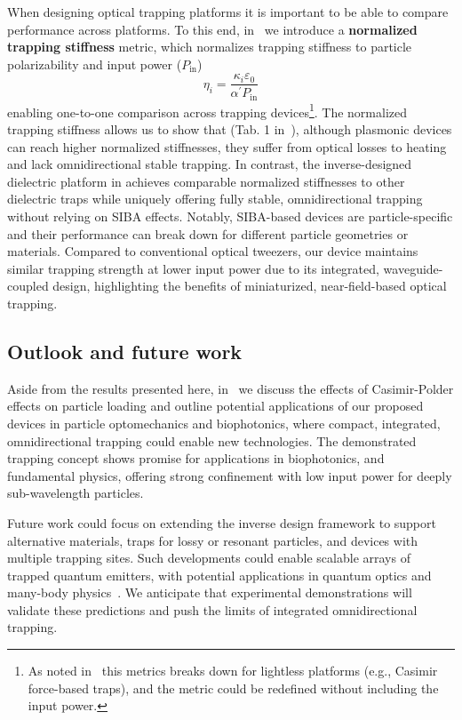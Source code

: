 When designing optical trapping platforms it is important to be able to compare performance across platforms. To this end, in~\cite{ownpub3} we introduce a \textbf{normalized
trapping stiffness} metric, which normalizes trapping stiffness to particle  polarizability and input power ($P_\text{in}$)
\begin{equation}
    \eta_i=\frac{\kappa_i \varepsilon_0}{\alpha^\prime P_{\text{in}}}
\end{equation}
enabling one-to-one comparison across trapping devices\footnote{As noted in~\cite{ownpub3} this metrics breaks down for lightless platforms (e.g., Casimir force-based traps), and the metric could be redefined
without including the input power.}. The normalized trapping stiffness allows us to show that (Tab. 1 in~\cite{ownpub3}), although plasmonic devices can reach higher normalized 
stiffnesses, they suffer from optical losses to heating and lack omnidirectional stable trapping. In contrast, the inverse-designed dielectric platform in 
 achieves comparable normalized stiffnesses to other dielectric traps while uniquely offering fully stable, omnidirectional trapping
  without relying on SIBA effects. Notably, SIBA-based devices are particle-specific and their performance can break down
   for different particle geometries or materials. Compared to conventional optical tweezers, our device maintains similar trapping
    strength at lower input power due to its integrated, waveguide-coupled design, highlighting the benefits of miniaturized,
     near-field-based optical trapping.

\subsection*{Outlook and future work}

Aside from the results presented here, in~\cite{ownpub2} we discuss the effects of Casimir-Polder effects
 on particle loading and outline potential applications of our proposed devices in particle optomechanics
  and biophotonics, where compact, integrated, omnidirectional trapping could
   enable new technologies. The demonstrated trapping concept shows promise for applications in biophotonics, and fundamental physics,
    offering strong confinement with low input power for deeply sub-wavelength particles.

Future work could focus on extending the inverse design framework to support alternative materials, 
traps for lossy or resonant particles, and devices with multiple trapping sites.
 Such developments could enable scalable arrays of trapped quantum emitters, with potential applications
  in quantum optics and many-body physics~\cite{chang_colloquium_2018}. We anticipate that experimental demonstrations
   will validate these predictions and push the limits of integrated omnidirectional trapping.

